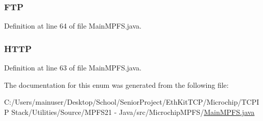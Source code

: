 \subsubsection[{F\+T\+P}]{\setlength{\rightskip}{0pt plus 5cm}F\+T\+P}\label{enum_microchip_m_p_f_s_1_1_main_m_p_f_s_1_1_u_p_l_o_a_d___p_r_o_t_o_c_o_l___o_p_t_i_o_n_a1d963cd94091bea0f4e16ced76caeb11}


Definition at line 64 of file Main\+M\+P\+F\+S.\+java.

\hypertarget{enum_microchip_m_p_f_s_1_1_main_m_p_f_s_1_1_u_p_l_o_a_d___p_r_o_t_o_c_o_l___o_p_t_i_o_n_a5bef6cce6371cc388126fd18c0173579}{}
\subsubsection[{H\+T\+T\+P}]{\setlength{\rightskip}{0pt plus 5cm}H\+T\+T\+P}\label{enum_microchip_m_p_f_s_1_1_main_m_p_f_s_1_1_u_p_l_o_a_d___p_r_o_t_o_c_o_l___o_p_t_i_o_n_a5bef6cce6371cc388126fd18c0173579}


Definition at line 63 of file Main\+M\+P\+F\+S.\+java.



The documentation for this enum was generated from the following file\+:\begin{DoxyCompactItemize}
\item 
C\+:/\+Users/mainuser/\+Desktop/\+School/\+Senior\+Project/\+Eth\+Kit\+T\+C\+P/\+Microchip/\+T\+C\+P\+I\+P Stack/\+Utilities/\+Source/\+M\+P\+F\+S21 -\/ Java/src/\+Microchip\+M\+P\+F\+S/\hyperlink{_main_m_p_f_s_8java}{Main\+M\+P\+F\+S.\+java}\end{DoxyCompactItemize}
